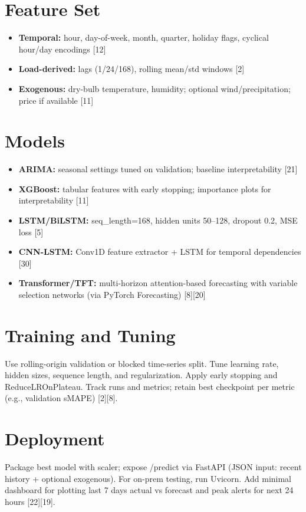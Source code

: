 \documentclass[12pt,a4paper]{report}
\begin{document}
\section{Feature Set}
\begin{itemize}
\item \textbf{Temporal:} hour, day-of-week, month, quarter, holiday flags, cyclical hour/day encodings [12]
\item \textbf{Load-derived:} lags (1/24/168), rolling mean/std windows [2]
\item \textbf{Exogenous:} dry-bulb temperature, humidity; optional wind/precipitation; price if available [11]
\end{itemize}

\section{Models}
\begin{itemize}
\item \textbf{ARIMA:} seasonal settings tuned on validation; baseline interpretability [21]
\item \textbf{XGBoost:} tabular features with early stopping; importance plots for interpretability [11]
\item \textbf{LSTM/BiLSTM:} seq\_length=168, hidden units 50--128, dropout 0.2, MSE loss [5]
\item \textbf{CNN-LSTM:} Conv1D feature extractor + LSTM for temporal dependencies [30]
\item \textbf{Transformer/TFT:} multi-horizon attention-based forecasting with variable selection networks (via PyTorch Forecasting) [8][20]
\end{itemize}

\section{Training and Tuning}
Use rolling-origin validation or blocked time-series split. Tune learning rate, hidden sizes, sequence length, and regularization. Apply early stopping and ReduceLROnPlateau. Track runs and metrics; retain best checkpoint per metric (e.g., validation sMAPE) [2][8].

\section{Deployment}
Package best model with scaler; expose /predict via FastAPI (JSON input: recent history + optional exogenous). For on-prem testing, run Uvicorn. Add minimal dashboard for plotting last 7 days actual vs forecast and peak alerts for next 24 hours [22][19].
\end{document}
